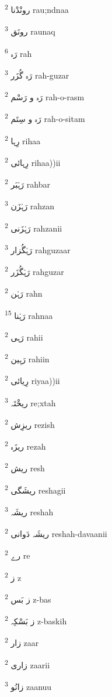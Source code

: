\documentclass[12pt]{article}
\begin{document}
\begin{multicols}{5}
{\ur رونْدْنا}   \textsuperscript{2} rau;ndnaa

{\ur رونَق}   \textsuperscript{3} raunaq

{\ur رَہ}   \textsuperscript{6} rah

{\ur رَہ گُزَر}   \textsuperscript{3} rah-guzar

{\ur رَہ و رَسْم}   \textsuperscript{2} rah-o-rasm

{\ur رَہ و سِتَم}   \textsuperscript{2} rah-o-sitam

{\ur رِہا}   \textsuperscript{2} rihaa

{\ur رِہائی}   \textsuperscript{2} rihaa))ii

{\ur رَہْبَر}   \textsuperscript{2} rahbar

{\ur رَہْزَن}   \textsuperscript{3} rahzan

{\ur رَہْزَنی}   \textsuperscript{2} rahzanii

{\ur رَہْگُزار}   \textsuperscript{3} rahguzaar

{\ur رَہْگُزَر}   \textsuperscript{2} rahguzar

{\ur رَہْن}   \textsuperscript{2} rahn

{\ur رَہْنا}   \textsuperscript{15} rahnaa

{\ur رَہی}   \textsuperscript{2} rahii

{\ur رَہِین}   \textsuperscript{2} rahiin

{\ur رِیائی}   \textsuperscript{2} riyaa))ii

{\ur ریخْتَہ}   \textsuperscript{3} re;xtah

{\ur ریزِش}   \textsuperscript{2} rezish

{\ur ریزَہ}   \textsuperscript{2} rezah

{\ur ریش}   \textsuperscript{2} resh

{\ur ریشَگی}   \textsuperscript{2} reshagii

{\ur ریشَہ}   \textsuperscript{3} reshah

{\ur ریشَہ دَوانی}   \textsuperscript{2} reshah-davaanii

{\ur رے}   \textsuperscript{2} re

{\ur ز}   \textsuperscript{2} z

{\ur ز بَس}   \textsuperscript{2} z-bas

{\ur ز بَسْکِہ}   \textsuperscript{2} z-baskih

{\ur زار}   \textsuperscript{2} zaar

{\ur زاری}   \textsuperscript{2} zaarii

{\ur زانُو}   \textsuperscript{3} zaanuu


\end{multicols}
\end{document}
